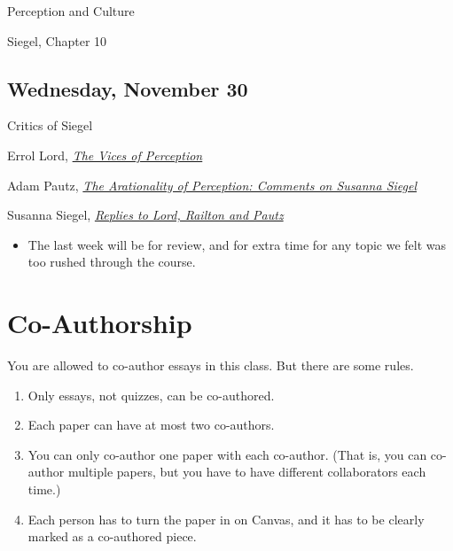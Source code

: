 \documentclass[
]{article}
\providecommand{\tightlist}{%
  \setlength{\itemsep}{0pt}\setlength{\parskip}{0pt}}\usepackage{longtable,booktabs,array}
\begin{document}
\begin{description}
\tightlist
\item[Topic]
Perception and Culture
\item[Required Reading]
Siegel, Chapter 10
\end{description}

\hypertarget{wednesday-november-30}{%
\subsection{Wednesday, November 30}\label{wednesday-november-30}}

\begin{description}
\tightlist
\item[Topic]
Critics of Siegel
\item[Required Reading]
Errol Lord,
\href{https://onlinelibrary.wiley.com/doi/10.1111/phpr.12734}{\emph{The
Vices of Perception}}

Adam Pautz,
\href{https://onlinelibrary.wiley.com/doi/10.1111/phpr.12733}{\emph{The
Arationality of Perception: Comments on Susanna Siegel}}
\item[Suggested Reading]
Susanna Siegel,
\href{https://onlinelibrary.wiley.com/doi/10.1111/phpr.12737}{\emph{Replies
to Lord, Railton and Pautz}}
\end{description}

\begin{itemize}
\tightlist
\item
  The last week will be for review, and for extra time for any topic we
  felt was too rushed through the course.
\end{itemize}

\newpage

\hypertarget{co-authorship}{%
\section{Co-Authorship}\label{co-authorship}}

You are allowed to co-author essays in this class. But there are some
rules.

\begin{enumerate}
\def\labelenumi{\arabic{enumi}.}
\tightlist
\item
  Only essays, not quizzes, can be co-authored.
\item
  Each paper can have at most two co-authors.
\item
  You can only co-author one paper with each co-author. (That is, you
  can co-author multiple papers, but you have to have different
  collaborators each time.)
\item
  Each person has to turn the paper in on Canvas, and it has to be
  clearly marked as a co-authored piece.
\end{enumerate}
\end{document}
